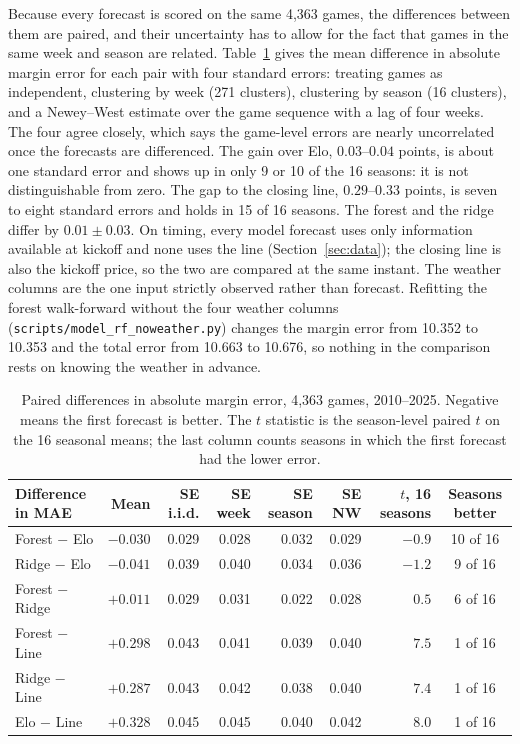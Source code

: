 \documentclass[11pt]{article}
\begin{document}
Because every forecast is scored on the same 4,363 games, the differences between them are paired, and their uncertainty has to allow for the fact that games in the same week and season are related. Table~\ref{tab:mae_diff} gives the mean difference in absolute margin error for each pair with four standard errors: treating games as independent, clustering by week (271 clusters), clustering by season (16 clusters), and a Newey--West estimate over the game sequence with a lag of four weeks. The four agree closely, which says the game-level errors are nearly uncorrelated once the forecasts are differenced. The gain over Elo, $0.03$--$0.04$ points, is about one standard error and shows up in only 9 or 10 of the 16 seasons: it is not distinguishable from zero. The gap to the closing line, $0.29$--$0.33$ points, is seven to eight standard errors and holds in 15 of 16 seasons. The forest and the ridge differ by $0.01 \pm 0.03$. On timing, every model forecast uses only information available at kickoff and none uses the line (Section~\ref{sec:data}); the closing line is also the kickoff price, so the two are compared at the same instant. The weather columns are the one input strictly observed rather than forecast. Refitting the forest walk-forward without the four weather columns (\texttt{scripts/model\_rf\_noweather.py}) changes the margin error from 10.352 to 10.353 and the total error from 10.663 to 10.676, so nothing in the comparison rests on knowing the weather in advance.

\begin{table}[H]
\centering
\footnotesize
\setlength{\tabcolsep}{4pt}
\begin{tabular}{lrrrrrrc}
\toprule
\textbf{Difference in MAE} & \textbf{Mean} & \textbf{SE i.i.d.} & \textbf{SE week} & \textbf{SE season} & \textbf{SE NW} & \textbf{$t$, 16 seasons} & \textbf{Seasons better} \\
\midrule
Forest $-$ Elo & $-0.030$ & 0.029 & 0.028 & 0.032 & 0.029 & $-0.9$ & 10 of 16 \\
Ridge $-$ Elo & $-0.041$ & 0.039 & 0.040 & 0.034 & 0.036 & $-1.2$ & 9 of 16 \\
Forest $-$ Ridge & $+0.011$ & 0.029 & 0.031 & 0.022 & 0.028 & $0.5$ & 6 of 16 \\
Forest $-$ Line & $+0.298$ & 0.043 & 0.041 & 0.039 & 0.040 & $7.5$ & 1 of 16 \\
Ridge $-$ Line & $+0.287$ & 0.043 & 0.042 & 0.038 & 0.040 & $7.4$ & 1 of 16 \\
Elo $-$ Line & $+0.328$ & 0.045 & 0.045 & 0.040 & 0.042 & $8.0$ & 1 of 16 \\
\bottomrule
\end{tabular}
\caption{Paired differences in absolute margin error, 4,363 games, 2010--2025. Negative means the first forecast is better. The $t$ statistic is the season-level paired $t$ on the 16 seasonal means; the last column counts seasons in which the first forecast had the lower error.}
\label{tab:mae_diff}
\end{table}
\end{document}
